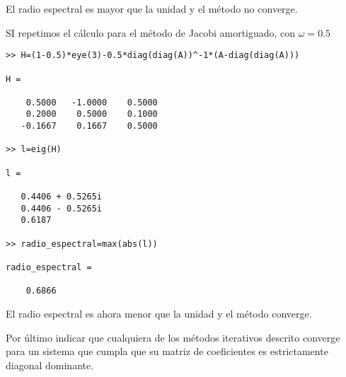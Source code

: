 El radio espectral es mayor que la unidad y el método no converge.

SI repetimos el cálculo para el método de Jacobi amortiguado, con $\omega=0.5$
\begin{verbatim}
>> H=(1-0.5)*eye(3)-0.5*diag(diag(A))^-1*(A-diag(diag(A)))

H =

    0.5000   -1.0000    0.5000
    0.2000    0.5000    0.1000
   -0.1667    0.1667    0.5000

>> l=eig(H)

l =

   0.4406 + 0.5265i
   0.4406 - 0.5265i
   0.6187          

>> radio_espectral=max(abs(l))

radio_espectral =

    0.6866
\end{verbatim}

El radio espectral es ahora menor que la unidad y el método converge.

Por último indicar que cualquiera de los métodos iterativos descrito converge para un sistema que cumpla que su matriz de coeficientes es estrictamente diagonal dominante.





